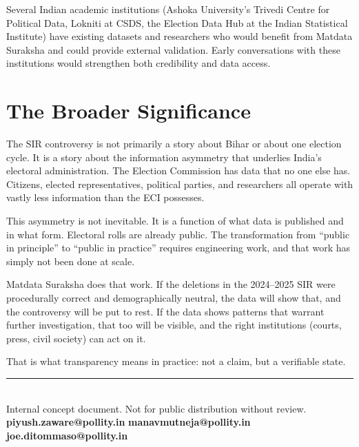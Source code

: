 \documentclass[11pt, a4paper]{article}
\begin{document}
\vspace{0.5em}

\begin{tcolorbox}[colback=safegreen!6, colframe=safegreen, sharp corners, boxrule=0.6pt, title={\bfseries Opportunity: Institutional Partnerships}]
Several Indian academic institutions (Ashoka University's Trivedi Centre for Political Data, Lokniti at CSDS, the Election Data Hub at the Indian Statistical Institute) have existing datasets and researchers who would benefit from Matdata Suraksha and could provide external validation. Early conversations with these institutions would strengthen both credibility and data access.
\end{tcolorbox}

\section{The Broader Significance}

The SIR controversy is not primarily a story about Bihar or about one election cycle. It is a story about the information asymmetry that underlies India's electoral administration. The Election Commission has data that no one else has. Citizens, elected representatives, political parties, and researchers all operate with vastly less information than the ECI possesses.

This asymmetry is not inevitable. It is a function of what data is published and in what form. Electoral rolls are already public. The transformation from ``public in principle'' to ``public in practice'' requires engineering work, and that work has simply not been done at scale.

Matdata Suraksha does that work. If the deletions in the 2024--2025 SIR were procedurally correct and demographically neutral, the data will show that, and the controversy will be put to rest. If the data shows patterns that warrant further investigation, that too will be visible, and the right institutions (courts, press, civil society) can act on it.

That is what transparency means in practice: not a claim, but a verifiable state.

\vspace{1.5em}

\begin{center}
{\color{pollityblue}\rule{0.5\linewidth}{0.4pt}}\\[0.5em]
{\small Internal concept document. Not for public distribution without review.}\\[0.3em]
{\small \textbf{piyush.zaware@pollity.in} \textbar{} \textbf{manavmutneja@pollity.in} \textbar{} \textbf{joe.ditommaso@pollity.in}}
\end{center}
\end{document}
